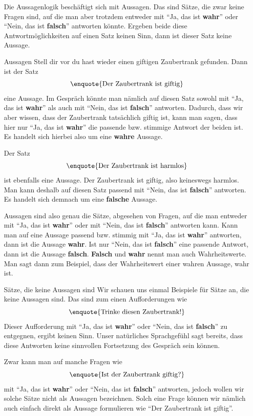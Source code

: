 \documentclass[../../main.tex]{subfiles}
\begin{document}
    Die Aussagenlogik beschäftigt sich mit Aussagen. Das sind Sätze, die zwar 
    keine Fragen sind, auf die man aber trotzdem entweder 
    mit \enquote{Ja, das ist \textbf{wahr}} oder 
    \enquote{Nein, das ist \textbf{falsch}} antworten könnte. Ergeben beide diese 
    Antwortmöglichkeiten auf einen Satz keinen Sinn, dann ist dieser Satz keine 
    Aussage.
    \begin{example}{Aussagen}
        Stell dir vor du hast wieder einen giftigen Zaubertrank gefunden. Dann ist der Satz
        \[\textrm{\enquote{Der Zaubertrank ist giftig}}\]
        eine Aussage.
        Im Gespräch könnte man nämlich auf diesen Satz sowohl mit \enquote{Ja, das ist \textbf{wahr}} als auch mit \enquote{Nein, das ist \textbf{falsch}} antworten. 
        Dadurch, dass wir aber wissen, dass der Zaubertrank tatsächlich giftig ist, kann man sagen, dass hier nur \enquote{Ja, das ist \textbf{wahr}} die passende bzw. stimmige Antwort der beiden ist. Es handelt sich hierbei also um eine \textbf{wahre} Aussage.
        
        Der Satz
        \[\textrm{\enquote{Der Zaubertrank ist harmlos}}\]
        ist ebenfalls eine Aussage. Der Zaubertrank ist giftig, also keineswegs harmlos. Man kann deshalb auf diesen Satz passend mit \enquote{Nein, das ist \textbf{falsch}} antworten. Es handelt sich demnach um eine \textbf{falsche} Aussage.
    \end{example}
    
    Aussagen sind also genau die Sätze, abgesehen von Fragen, auf die man entweder 
    mit \enquote{Ja, das ist \textbf{wahr}} oder mit \enquote{Nein, das ist 
    \textbf{falsch}} antworten kann. Kann man auf eine Aussage passend bzw. stimmig 
    mit \enquote{Ja, das ist \textbf{wahr}} antworten, dann ist die Aussage 
    \textbf{wahr}. Ist nur \enquote{Nein, das ist \textbf{falsch}} eine passende 
    Antwort, dann ist die Aussage \textbf{falsch}. \textbf{Falsch} und \textbf{wahr} nennt
    man auch Wahrheitswerte. Man sagt dann zum Beispiel, dass der Wahrheitswert einer wahren
    Aussage, wahr ist.

    \begin{example}{Sätze, die keine Aussagen sind}
        Wir schauen uns einmal Beispiele für Sätze an, die keine Aussagen sind. Das sind zum einen Aufforderungen wie
        \[\textrm{\enquote{Trinke diesen Zaubertrank!}}\]
        Dieser Aufforderung mit \enquote{Ja, das ist \textbf{wahr}} oder \enquote{Nein, das ist \textbf{falsch}} zu entgegnen, ergibt keinen Sinn. Unser natürliches Sprachgefühl sagt bereits, dass diese Antworten keine sinnvollen Fortsetzung des Gespräch sein können.
        
        Zwar kann man auf manche Fragen wie
         \[\textrm{\enquote{Ist der Zaubertrank giftig?}}\]
        mit \enquote{Ja, das ist \textbf{wahr}} oder \enquote{Nein, das ist \textbf{falsch}} antworten, jedoch wollen wir solche Sätze nicht als Aussagen bezeichnen. Solch eine Frage können wir nämlich auch einfach direkt als Aussage formulieren wie
        \enquote{Der Zaubertrank ist giftig}.
    \end{example}
\end{document}
